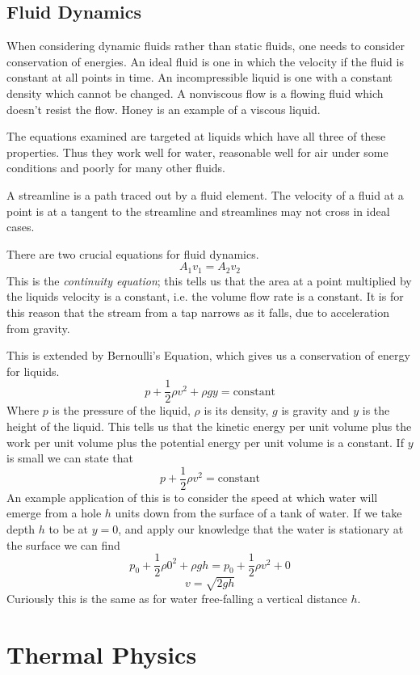 \documentclass[12pt]{report}
\begin{document}
\begin{flushleft}
\subsection*{Fluid Dynamics}

When considering dynamic fluids rather than static fluids, one needs to
consider conservation of energies. An ideal fluid is one in which the velocity
if the fluid is constant at all points in time. An incompressible liquid is one
with a constant density which cannot be changed. A nonviscous flow is a flowing
fluid which doesn't resist the flow. Honey is an example of a viscous liquid.
\par
The equations examined are targeted at liquids which have all three of these
properties. Thus they work well for water, reasonable well for air under some
conditions and poorly for many other fluids. \par
A streamline is a path traced out by a fluid element. The velocity of a fluid
at a point is at a tangent to the streamline and streamlines may not cross in
ideal cases. \par
There are two crucial equations for fluid dynamics.
\[A_1v_1 = A_2v_2\]
This is the \textit{continuity equation}; this tells us that the area at a
point multiplied by the liquids velocity is a constant, i.e. the volume flow
rate is a constant. It is for this reason that the stream from a tap narrows as
it falls, due to acceleration from gravity. \par
This is extended by Bernoulli's Equation, which gives us a conservation of
energy for liquids.
\[p + \frac{1}{2}\rho v^2 + \rho gy = \mathrm{constant}\]
Where \(p\) is the pressure of the liquid, \(\rho\) is its density, \(g\) is
gravity and \(y\) is the height of the liquid. This tells us that the kinetic
energy per unit volume plus the work per unit volume plus the potential energy
per unit volume is a constant. If \(y\) is small we can state that
\[p + \frac{1}{2}\rho v^2 = \mathrm{constant}\]
An example application of this is to consider the speed at which water will
emerge from a hole \(h\) units down from the surface of a tank of water. If we
take depth \(h\) to be at \(y = 0\), and apply our knowledge that the water is
stationary at the surface we can find
\[p_0 + \frac{1}{2}\rho0^2 + \rho gh = p_0 + \frac{1}{2}\rho v^2 + 0\]
\[v = \sqrt{2gh}\]
Curiously this is the same as for water free-falling a vertical distance \(h\).

\section*{Thermal Physics}


\end{flushleft}
\end{document}
